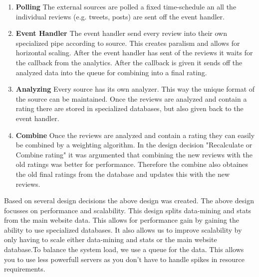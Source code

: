 \begin{enumerate}
\item {\bf Polling} The external sources are polled a fixed time-schedule an all the individual reviews (e.g. tweets, posts) are sent off the event handler.
\item {\bf Event Handler} The event handler send every review into their own specialized pipe according to source. This creates paralism and allows for horizontal scaling. After the event handler has sent of the reviews it waits for the callback from the analytics. After the callback is given it sends off the analyzed data into the queue for combining into a final rating.
 \item {\bf Analyzing} Every source has its own analyzer. This way the unique format of the source can be maintained. Once the reviews are analyzed and contain a rating there are stored in specialized databases, but also given back to the event handler.
\item {\bf Combine} Once the reviews are analyzed and contain a rating they can easily be combined by a weighting algorithm. In the design decision "Recalculate or Combine rating" it was argumented that combining the new reviews with the old ratings was better for performance. Therefore the combine also obtaines the old final ratings from the database and updates this with the new reviews.
\end{enumerate}

Based on several design decisions the above design was created. The above design focusses on performance and scalability.
This design splits data-mining and stats from the main website data. This allows for performance gain by gaining the ability to use specialized databases. It also allows us to improve scalability by only having to scale either data-mining and stats or the main website database.To balance the system load, we use a queue for the data. This allows you to use less powerfull servers as you don't have to handle spikes in resource requirements.
